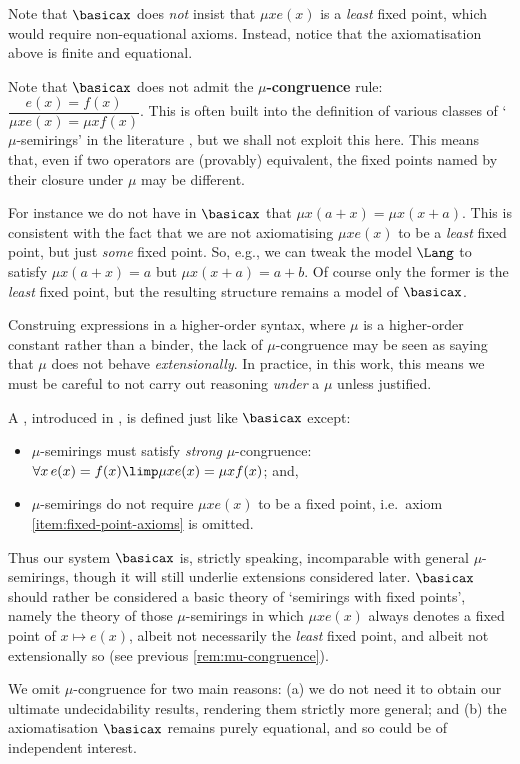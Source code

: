 Note that $\basicax$ does \emph{not} insist that $\mu x e(x)$ is a \emph{least} fixed point, which would require non-equational axioms. 
Instead, notice that the axiomatisation above is finite and equational.


\begin{remark}
    [On $\mu$-congruence]
    \label{rem:mu-congruence}
    Note that $\basicax$ does not admit the \textbf{$\mu$-congruence} rule: $\dfrac{e(x)=f(x)}{\mu x e(x)=\mu x f(x)}$.
    This is often built into the definition of various classes of `$\mu$-semirings' in the literature \cite{EsikLeiss05,GHK13,Leiss16}, but we shall not exploit this here.
    This means that, even if two operators are (provably) equivalent, the fixed points named by their closure under $\mu$ may be different. 
    
    For instance we do not have in $\basicax$ that $\mu x (a+x) = \mu x (x+a)$.
    This is consistent with the fact that we are not axiomatising $\mu x e(x)$ to be a \emph{least} fixed point, but just \emph{some} fixed point.
    So, e.g., we can tweak the model $\Lang$ to satisfy $\mu x (a+x) =a $ but $\mu x (x+a) = a+b$.
    Of course only the former is the \emph{least} fixed point, but the resulting structure remains a model of $\basicax$.

    Construing expressions in a higher-order syntax, where $\mu$ is a higher-order constant rather than a binder, the lack of $\mu$-congruence may be seen as saying that $\mu$ does not behave \emph{extensionally}.
    In practice, in this work, this means we must be careful to not carry out reasoning \emph{under} a $\mu$ unless justified.
\end{remark}

\begin{remark}
    A , introduced in \cite{EsikLeiss05}, is defined just like $\basicax$ except:
    \begin{itemize}
        \item $\mu$-semirings must satisfy \emph{strong} $\mu$-congruence:
        $\forall x\,  e(x) = f(x) \limp \mu x e(x) = \mu x f(x)$; and,
        \item $\mu$-semirings do not require $\mu x e(x) $ to be a fixed point, i.e.\ axiom \eqref{item:fixed-point-axioms} is omitted.
    \end{itemize}
    Thus our system $\basicax$ is, strictly speaking, incomparable with general $\mu$-semirings, though it will still underlie extensions considered later.
     $\basicax$ should rather be considered a basic theory of `semirings with fixed points', namely the theory of those $\mu$-semirings in which $\mu x e(x)$ always denotes a fixed point of $x \mapsto e(x)$, albeit not necessarily the \emph{least} fixed point, and albeit not extensionally so (see previous \cref{rem:mu-congruence}).

% 
     We omit $\mu$-congruence for two main reasons: (a) we do not need it to obtain our ultimate undecidability results, rendering them strictly more general; and (b) the axiomatisation $\basicax$ remains purely equational, and so could be of independent interest.
\end{remark}


